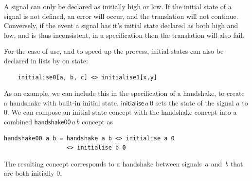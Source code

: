 \documentclass[british,conference,compsoc]{IEEEtran}
\begin{document}
\noindent A signal can only be declared as initially high or low. If the 
initial state of a signal is not defined, an error will occur, and the 
translation will not continue. Conversely, if the event a signal has it's 
initial state declared as both high and low, and is thus inconsistent, in a 
specification then the translation will also fail.

For the ease of use, and to speed up the process, initial states can also be 
declared in lists by on state:

\begin{lstlisting}
    initialise0[a, b, c] <> initialise1[x,y]
\end{lstlisting}

\noindent As an example, we can include this in the specification of a 
handshake, to create a handshake with built-in initial state.
$\mathsf{initialise}\,a\, 0$ sets the state of the signal
$a$ to $0$. We can compose an initial state concept with the handshake concept
into a combined $\mathsf{handshake00}\,a\, b$ concept as

\begin{lstlisting}
handshake00 a b = handshake a b <> initialise a 0 
                  <> initialise b 0
\end{lstlisting}

The resulting concept corresponds to a handshake between signals~$a$
and~$b$ that are both initially $0$.

\vspace{-2mm}
\end{document}
